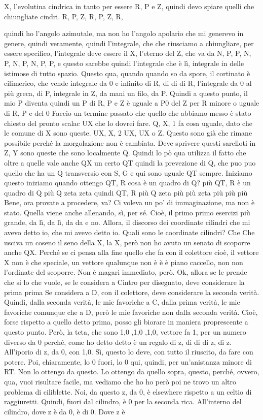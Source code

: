 \begin{soluzione}
{X, l'evolutina cindrica in tanto per essere R, P e Z, quindi devo spiare quelli che chiungliate cindri. R, P, Z, R, P, Z, R, 
   
   quindi ho l'angolo azimutale, ma non ho l'angolo apolario che mi generevo in genere, quindi veramente, quindi l'integrale, che che riusciamo a chiungliare, per essere specifico, l'integrale deve essere il X, l'eterno del Z, che va da N, P, P, N, P, N, P, N, P, P, e questo sarebbe quindi l'integrale che è lì, integrale in delle istimose di tutto spazio. Questo qua, quando quando so da spore, il cortinato è cilimerico, che vende integrale da 0 e infinito di R, di di di R, l'integrale da 0 al più greca, di P, integrale in Z, da mani un filo, da P. Quindi a questo punto, il mio P diventa quindi un P di R, P e Z è uguale a P0 del Z per R minore o uguale di R, P e del 0 Faccio un termine passato che quello che abbiamo messo è stato chiesto del pronto scalac UX che lo dovrei fare. Q, X, 1 fa cosa uguale, dato che le comune di X sono queste. UX, X, 2 UX, UX o Z. Questo sono già che rimane possibile perché la morgolazione non è cambiata. Deve sprivere questi sarelloti in Z, Y sono queste che sono localmente Q. Quindi lo pò qua utilizza il fatto che oltre a quelle vale anche QX un certo QT quindi la prevezione di Q, che puo puo quello che ha un Q transversio con S, G e qui sono uguale QT sempre. Iniziamo questo iniziamo quando ottengo QT, R cosa è un quadro di Q? più QT, R è un quadro di Q più Q zeta zeta quindi QT, R più Q zeta più più zeta più più più Bene, ora provate a procedere, va? Ci voleva un po' di immaginazione, ma non è stato. Quella viene anche allenando, sì, per sé. Cioè, il primo primo esercizi più grande, da lì, da lì, da da e no. Allora, il discorso dei coordinate cilindri che mi avevo detto io, che mi avevo detto io. Quali sono le coordinate cilindri? Che Che usciva un coseno il seno della X, la X, però non ho avuto un senato di scoporre anche QX. Perché se ci pensa alla fine quello che fa con il colettore cioè, il vettore X non è che speciale, un vettore qualunque non è è è piano caccello, non non l'ordinate del scoporre. Non è magari immediato, però. Ok, allora se le prende che si lo che vuole, se le considera a Cintro per disegnato, deve considerare la prima prima Se considera a D, con il colettore, deve considerare la seconda verità. Quindi, dalla seconda verità, le mie favoriche a C, dalla prima verità, le mie favoriche comunque che a D, però le mie favoriche non dalla seconda verità. Cioè, forse rispetto a quello detto prima, posso gli biorare in maniera proprescente a questo punto. Però, la teta, che sono 1,0 ,1,0 ,1,0, vettore fa 1, per un numero diverso da 0 perché, come ho detto detto è un regalo di z, di di di z, di z. All'iporio di z, da 0, con 1,0. Sì, questo lo deve, con tutto il riuscito, da fare con potere. Poi, chiaramente, lo 0 fuori, lo 0 qui, quindi, per un'anistanza minore di RT. Non lo ottengo da questo. Lo ottengo da quello sopra, questo, perché, ovvero, qua, vuoi risultare facile, ma vediamo che ho ho però poi ne trovo un altro problema di ciliblette. Noi, da questo z, da 0, è elsewhere rispetto a un celtio di raggiuretti. Quindi, fuori dal cilindro, è 0 per la seconda rica. All'interno del cilindro, dove z è da 0, è di 0. Dove z è }
\end{soluzione}
